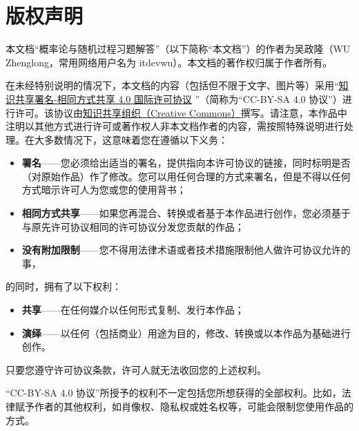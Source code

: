 

\section*{版权声明}

本文档“概率论与随机过程习题解答”（以下简称“本文档”）的作者为吴政隆（WU Zhenglong，常用网络用户名为 itdevwu）。本文档的著作权归属于作者所有。

在未经特别说明的情况下，本文档的内容（包括但不限于文字、图片等）采用“\href{https://creativecommons.org/licenses/by-sa/4.0/deed.zh}{知识共享署名-相同方式共享 4.0 国际许可协议} ”（简称为“CC-BY-SA 4.0 协议”）进行许可。该协议由\href{https://creativecommons.org/}{知识共享组织（Creative Commons）}撰写。请注意，本作品中注明以其他方式进行许可或著作权人非本文档作者的内容，需按照特殊说明进行处理。在大多数情况下，这意味着您在遵循以下义务：

\begin{itemize}
    \item \textbf{署名}——您必须给出适当的署名，提供指向本许可协议的链接，同时标明是否（对原始作品）作了修改。您可以用任何合理的方式来署名，但是不得以任何方式暗示许可人为您或您的使用背书；
    
    \item \textbf{相同方式共享}——如果您再混合、转换或者基于本作品进行创作，您必须基于与原先许可协议相同的许可协议分发您贡献的作品；
    
    \item \textbf{没有附加限制}——您不得用法律术语或者技术措施限制他人做许可协议允许的事，
    
\end{itemize}

\noindent 的同时，拥有了以下权利：

\begin{itemize}
    \item \textbf{共享}——在任何媒介以任何形式复制、发行本作品；
    
    \item \textbf{演绎}——以任何（包括商业）用途为目的，修改、转换或以本作品为基础进行创作。
    
\end{itemize} 

只要您遵守许可协议条款，许可人就无法收回您的上述权利。

“CC-BY-SA 4.0 协议”所授予的权利不一定包括您所想获得的全部权利。比如，法律赋予作者的其他权利，如肖像权、隐私权或姓名权等，可能会限制您使用作品的方式。


